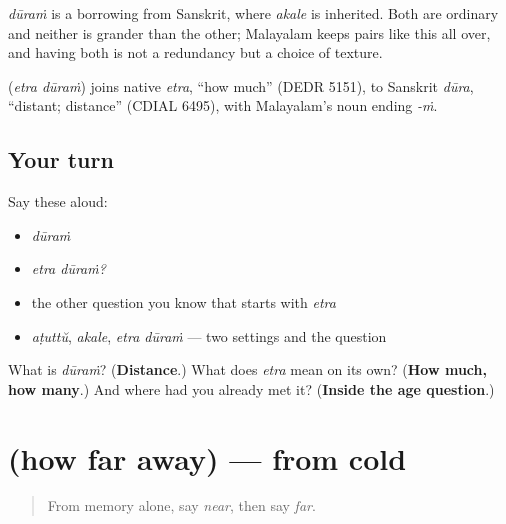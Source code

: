 \emph{dūraṁ} is a borrowing from Sanskrit, where \emph{akale} is inherited. Both are ordinary and neither is grander than the other; Malayalam keeps pairs like this all over, and having both is not a redundancy but a choice of texture.

\begin{cousinweb}
\textbf{ } (\emph{etra dūraṁ}) joins native \emph{etra}, \textquotedblleft{}how much\textquotedblright{} (DEDR 5151), to Sanskrit \emph{dūra}, \textquotedblleft{}distant; distance\textquotedblright{} (CDIAL 6495), with Malayalam's noun ending \emph{-ṁ}.
\end{cousinweb}

\subsection*{Your turn}
Say these aloud:

\begin{itemize}
\raggedright
  \item \emph{dūraṁ}
  \item \emph{etra dūraṁ?}
  \item the other question you know that starts with \emph{etra}
  \item \emph{aṭuttŭ}, \emph{akale}, \emph{etra dūraṁ} — two settings and the question
\end{itemize}

\begin{tcolorbox}[breakable,colback=teal!4,colframe=teal!35!black,title={Before you move on}]
What is \emph{dūraṁ}? (\textbf{Distance}.) What does \emph{etra} mean on its own? (\textbf{How much, how many}.) And where had you already met it? (\textbf{Inside the age question}.)
\end{tcolorbox}
\section[(how far away)]{(how far away) — from cold}

\label{lesson:ML-R81-distance-recall}



\begin{quote}
From memory alone, say \emph{near}, then say \emph{far}.
\end{quote}

